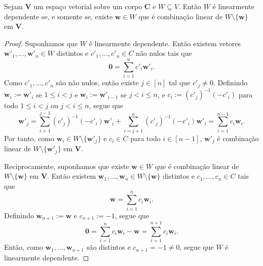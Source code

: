 \begin{proposition}
	Sejam $\bm V$ um espaço vetorial sobre um corpo $\bm C$ e $W \subseteq V$. Então $W$ é linearmente dependente se, e somente se, existe $\bm w \in W$ que é combinação linear de $W \setminus \{\bm w\}$ em $\bm V$.
\end{proposition}
\begin{proof}
	Suponhamos que $W$ é linearmente dependente. Então existem vetores $\bm w'_1,\ldots,\bm w'_n \in W$ distintos e $c'_1,\ldots,c'_n \in C$ não nulos tais que
	\begin{equation*}
	\bm 0 = \sum_{i=1}^n c'_i \bm w'_i.
	\end{equation*}
Como $c'_1,\ldots,c'_n$ são não nulos, então existe $j \in [n]$ tal que $c'_j \neq 0$. Definindo $\bm w_i := \bm w'_i$ se $1 \leq i < j$ e $\bm w_i := \bm w'_{i-1}$ se $j < i \leq n$, e $c_i := (c'_j)^{-1}(-c'_i)$ para todo $1 \leq i < j$ ou $j < i \leq n$, segue que
	\begin{equation*}
	\bm w'_j = \sum_{i=1}^{j-1} (c'_j)^{-1}(-c'_i) \bm w'_i + \sum_{i=j+1}^n (c'_j)^{-1}(-c'_i) \bm w'_i = \sum_{i=1}^{n-1} c_i \bm w_i.
	\end{equation*}
Por tanto, como $\bm w_i \in W \setminus \{\bm w'_j\}$ e $c_i \in C$ para todo $i \in [n-1]$, $\bm w'_j$ é combinação linear de $W \setminus \{\bm w'_j\}$ em $\bm V$.

	Reciprocamente, suponhamos que existe $\bm w \in W$ que é combinação linear de $W \setminus \{\bm w\}$ em $\bm V$. Então existem $\bm w_1, \ldots, \bm w_n \in W \setminus \{\bm w\}$ distintos e $c_1, \ldots, c_n \in C$ tais que
	\begin{equation*}
	\bm w = \sum_{i=1}^n c_i \bm w_i.
	\end{equation*}
Definindo $\bm w_{n+1} := \bm w$ e $c_{n+1} := -1$, segue que
	\begin{equation*}
	\bm 0 = \sum_{i=1}^n c_i \bm w_i - \bm w = \sum_{i=1}^{n+1} c_i \bm w_i.
	\end{equation*}
Então, como $\bm w_1, \ldots, \bm w_{n+1}$ são distintos e $c_{n+1} = -1 \neq 0$, segue que $W$ é linearmente dependente.
\end{proof}


